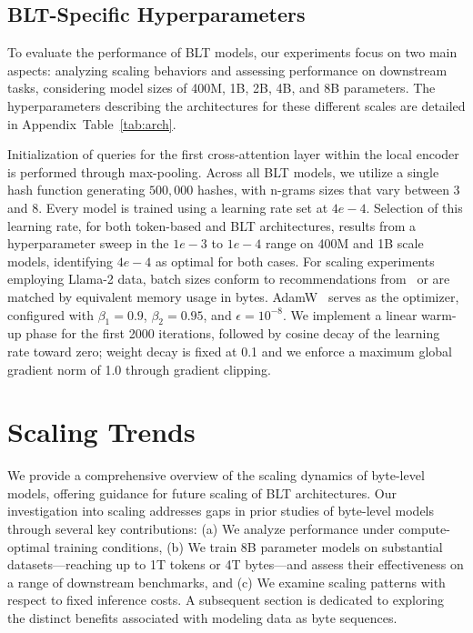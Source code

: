 \subsection{{\textsc BLT}-Specific Hyperparameters}  
To evaluate the performance of {\textsc BLT} models, our experiments focus on two main aspects: analyzing scaling behaviors and assessing performance on downstream tasks, considering model sizes of 400M, 1B, 2B, 4B, and 8B parameters. The hyperparameters describing the architectures for these different scales are detailed in Appendix~Table~\ref{tab:arch}. 

Initialization of queries for the first cross-attention layer within the local encoder is performed through max-pooling. Across all {\textsc BLT} models, we utilize a single hash function generating $500,000$ hashes, with n-grams sizes that vary between 3 and 8. Every model is trained using a learning rate set at $4e-4$. Selection of this learning rate, for both token-based and {\textsc BLT} architectures, results from a hyperparameter sweep in the $1e-3$ to $1e-4$ range on 400M and 1B scale models, identifying $4e-4$ as optimal for both cases. For scaling experiments employing Llama-2 data, batch sizes conform to recommendations from~\cite{dubey2024llama} or are matched by equivalent memory usage in bytes. AdamW~\citep{adamw} serves as the optimizer, configured with $\beta_1 = 0.9$, $\beta_2 = 0.95$, and $\epsilon=10^{-8}$. We implement a linear warm-up phase for the first 2000 iterations, followed by cosine decay of the learning rate toward zero; weight decay is fixed at 0.1 and we enforce a maximum global gradient norm of 1.0 through gradient clipping.

\section{Scaling Trends}
\label{section:scaling}

We provide a comprehensive overview of the scaling dynamics of byte-level models, offering guidance for future scaling of {\textsc BLT} architectures. Our investigation into scaling addresses gaps in prior studies of byte-level models through several key contributions: (a) We analyze performance under compute-optimal training conditions, (b) We train 8B parameter models on substantial datasets—reaching up to 1T tokens or 4T bytes—and assess their effectiveness on a range of downstream benchmarks, and (c) We examine scaling patterns with respect to fixed inference costs. A subsequent section is dedicated to exploring the distinct benefits associated with modeling data as byte sequences.

